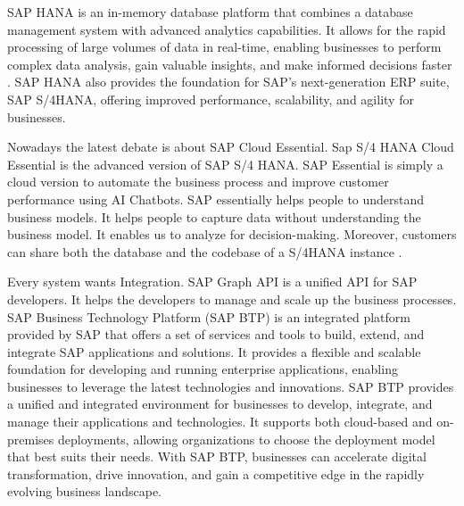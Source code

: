 \documentclass{article}
\begin{document}
SAP HANA is an in-memory database platform that combines a database management system with advanced analytics capabilities. It allows for the rapid processing of large volumes of data in real-time, enabling businesses to perform complex data analysis, gain valuable insights, and make informed decisions faster \parencite{lombardi2023}. SAP HANA also provides the foundation for SAP's next-generation ERP suite, SAP S/4HANA, offering improved performance, scalability, and agility for businesses.

Nowadays the latest debate is about SAP Cloud Essential. Sap S/4 HANA Cloud Essential is the advanced version of SAP S/4 HANA. SAP Essential is simply a cloud version to automate the business process and improve customer performance using AI Chatbots. SAP essentially helps people to understand business models. It helps people to capture data without understanding the business model. It enables us to analyze for decision-making. Moreover, customers can share both the database and the codebase of a S/4HANA instance \parencite{singh2023life}. 

Every system wants Integration. SAP Graph API is a unified API for SAP developers. It helps the developers to manage and scale up the business processes. SAP Business Technology Platform (SAP BTP) is an integrated platform provided by SAP that offers a set of services and tools to build, extend, and integrate SAP applications and solutions. It provides a flexible and scalable foundation for developing and running enterprise applications, enabling businesses to leverage the latest technologies and innovations. SAP BTP provides a unified and integrated environment for businesses to develop, integrate, and manage their applications and technologies. It supports both cloud-based and on-premises deployments, allowing organizations to choose the deployment model that best suits their needs. With SAP BTP, businesses can accelerate digital transformation, drive innovation, and gain a competitive edge in the rapidly evolving business landscape. \parencite{cox2020saps}

\maketitle
\end{document}
